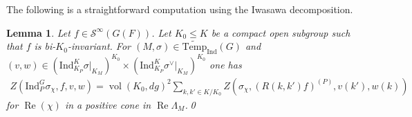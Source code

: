\documentclass[10pt]{amsart}
\newtheorem{lemma}[theorem]{Lemma}
\theoremstyle{definition}
\numberwithin{equation}{section}
\DeclareMathOperator{\vol}{\mathrm{vol}}
\numberwithin{equation}{subsection}
\newcommand{\Ind}{\mathrm{Ind}}
\newcommand{\Temp}{\mathrm{Temp}}
\renewcommand{\Re}{\mathop{\mathrm{Re}}}
\begin{document}
The following is a straightforward computation using the Iwasawa decomposition.

\begin{lemma}\label{constant:zeta:identity} Let $f\in \mathcal{S}^\infty(G(F))$. Let $K_0\leq K$ be a compact open subgroup such that $f$ is bi-$K_0$-invariant.  For $(M,\sigma)\in\widetilde{\Temp}_\Ind(G)$ and $(v,w)\in( \Ind_{K_P}^K\sigma\vert_{K_M})^{K_0}\times (\Ind_{K_P}^K\sigma^\vee\vert_{K_M})^{K_0}$ one has
\begin{align}\label{eq:descendzeta}
    Z(\Ind_P^G\sigma_\chi,f,v,w) = \vol(K_0,dg)^2\sum_{k,k'\in K/K_0} Z(\sigma_\chi,(R(k,k')f)^{(P)},v(k'),w(k))
\end{align}
for $\Re(\chi)$ in a positive cone in $\Re\Lambda_M$.\qed
\end{lemma}
\end{document}
